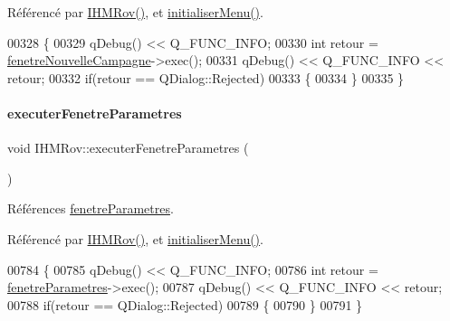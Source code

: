 Référencé par \hyperlink{class_i_h_m_rov_a5dac1fb4612866cc61f699a415e0ef6b}{I\+H\+M\+Rov()}, et \hyperlink{class_i_h_m_rov_aebbcb2325c2d1a88a012d8408e2d6223}{initialiser\+Menu()}.


\begin{DoxyCode}
00328 \{
00329     qDebug() << Q\_FUNC\_INFO;
00330     \textcolor{keywordtype}{int} retour = \hyperlink{class_i_h_m_rov_a13c12a93de7fc77c32f0108ae73cec06}{fenetreNouvelleCampagne}->exec();
00331     qDebug() << Q\_FUNC\_INFO << retour;
00332     \textcolor{keywordflow}{if}(retour == QDialog::Rejected)
00333     \{
00334     \}
00335 \}
\end{DoxyCode}
\mbox{\label{class_i_h_m_rov_a2ec97de9b75c073c6a4dd0792a284002}} 
\paragraph{\texorpdfstring{executer\+Fenetre\+Parametres}{executerFenetreParametres}}
{\footnotesize\ttfamily void I\+H\+M\+Rov\+::executer\+Fenetre\+Parametres (\begin{DoxyParamCaption}{ }\end{DoxyParamCaption})\hspace{0.3cm}{\ttfamily [slot]}}



Références \hyperlink{class_i_h_m_rov_a277956dfb79e5345e5ae0117fe41ddf2}{fenetre\+Parametres}.



Référencé par \hyperlink{class_i_h_m_rov_a5dac1fb4612866cc61f699a415e0ef6b}{I\+H\+M\+Rov()}, et \hyperlink{class_i_h_m_rov_aebbcb2325c2d1a88a012d8408e2d6223}{initialiser\+Menu()}.


\begin{DoxyCode}
00784 \{
00785     qDebug() << Q\_FUNC\_INFO;
00786     \textcolor{keywordtype}{int} retour = \hyperlink{class_i_h_m_rov_a277956dfb79e5345e5ae0117fe41ddf2}{fenetreParametres}->exec();
00787     qDebug() << Q\_FUNC\_INFO << retour;
00788     \textcolor{keywordflow}{if}(retour == QDialog::Rejected)
00789     \{
00790     \}
00791 \}
\end{DoxyCode}
\mbox{\label{class_i_h_m_rov_a149d6d6325acf3f00bf025cb2fbac05f}} 
